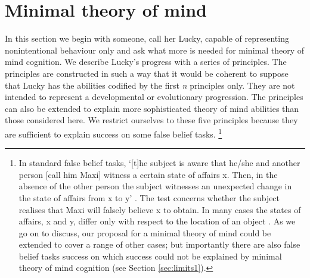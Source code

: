 \documentclass[12pt,\papersize]{extarticle}
\begin{document}







\section{Minimal theory of mind}
\label{sec:minimal}
In this section we begin with someone, call her Lucky, capable  of representing nonintentional behaviour only and ask what more is needed for minimal theory of mind cognition.  We describe Lucky’s progress with a series of principles. The principles are constructed in such a way that it would be coherent to suppose that Lucky has the abilities codified by the first \textit{n} principles only. They are not intended to represent a developmental or evolutionary progression.  The principles can also be extended to explain more sophisticated theory of mind abilities than those considered here.  We restrict ourselves to these five principles because they are sufficient to explain success on some false belief tasks.%
\footnote{
In standard false belief tasks, `[t]he subject is aware that he/she and another person [call him Maxi] witness a certain state of affairs x.  Then, in the absence of the other person the subject witnesses an unexpected change in the state of affairs from x to y' \citep[][p.\ 106]{en_89}.  The test concerns whether the subject realises that Maxi will falsely believe x to obtain.  In many cases the states of affairs, x and y, differ only with respect to the location of an object \citep[e.g.][]{en_1092, en_1208, en_1824}. 
As we go on to discuss, our proposal for a minimal theory of mind could be extended to cover a range of other cases;
but importantly there are also false belief tasks success on which success could not be explained by minimal theory of mind cognition (see Section \vref{sec:limits1}).
}
\end{document}
